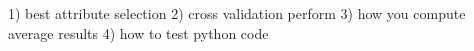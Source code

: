 1) best attribute selection
2) cross validation perform
3) how you compute average results
4) how to test python code

